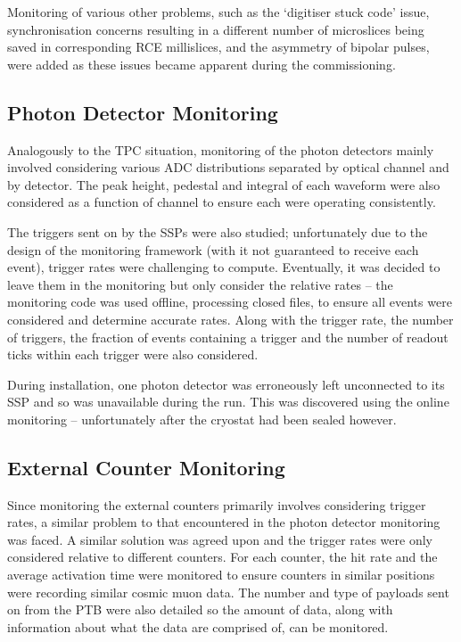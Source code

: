 Monitoring of various other problems, such as the `digitiser stuck code' issue, synchronisation concerns resulting in a different number of microslices being saved in corresponding RCE millislices, and the asymmetry of bipolar pulses, were added as these issues became apparent during the commissioning.

\subsection{Photon Detector Monitoring}\label{sec:PhotonMonitoring}

Analogously to the TPC situation, monitoring of the photon detectors mainly involved considering various ADC distributions separated by optical channel and by detector.  The peak height, pedestal and integral of each waveform were also considered as a function of channel to ensure each were operating consistently.

The triggers sent on by the SSPs were also studied; unfortunately due to the design of the monitoring framework (with it not guaranteed to receive each event), trigger rates were challenging to compute.  Eventually, it was decided to leave them in the monitoring but only consider the relative rates -- the monitoring code was used offline, processing closed files, to ensure all events were considered and determine accurate rates.  Along with the trigger rate, the number of triggers, the fraction of events containing a trigger and the number of readout ticks within each trigger were also considered.

During installation, one photon detector was erroneously left unconnected to its SSP and so was unavailable during the run.  This was discovered using the online monitoring -- unfortunately after the cryostat had been sealed however.

\subsection{External Counter Monitoring}\label{sec:CounterMonitoring}

Since monitoring the external counters primarily involves considering trigger rates, a similar problem to that encountered in the photon detector monitoring was faced.  A similar solution was agreed upon and the trigger rates were only considered relative to different counters.  For each counter, the hit rate and the average activation time were monitored to ensure counters in similar positions were recording similar cosmic muon data.  The number and type of payloads sent on from the PTB were also detailed so the amount of data, along with information about what the data are comprised of, can be monitored.

